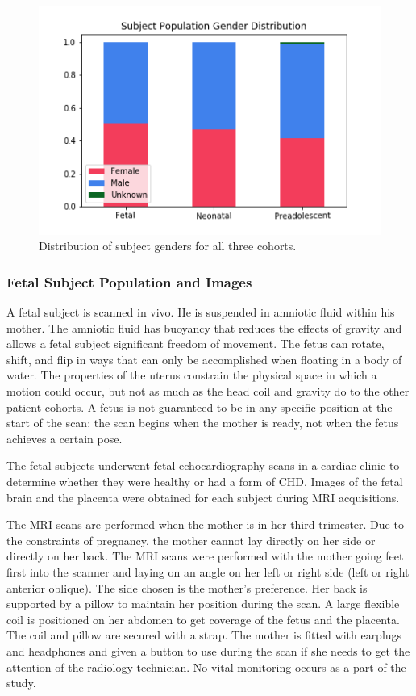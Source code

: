 \begin{figure}
\centering
\includegraphics[width=.75\textwidth]{5/demo_clinical_subj_gender.png}
\caption{Distribution of subject genders for all three cohorts.}
\label{ch5:clinical:gender}
\end{figure}

\subsubsection{Fetal Subject Population and Images}


A fetal subject is scanned in vivo. He is suspended in amniotic fluid within his mother. The amniotic fluid has buoyancy that reduces the effects of gravity and allows a fetal subject significant freedom of movement. The fetus can rotate, shift, and flip in ways that can only be accomplished when floating in a body of water. The properties of the uterus constrain the physical space in which a motion could occur, but not as much as the head coil and gravity do to the other patient cohorts. A fetus is not guaranteed to be in any specific position at the start of the scan: the scan begins when the mother is ready, not when the fetus achieves a certain pose. 

The fetal subjects underwent fetal echocardiography scans in a cardiac clinic to determine whether they were healthy or had a form of CHD. Images of the fetal brain and the placenta were obtained for each subject during MRI acquisitions.

The MRI scans are performed when the mother is in her third trimester. Due to the constraints of pregnancy, the mother cannot lay directly on her side or directly on her back. The MRI scans were performed with the mother going feet first into the scanner and laying on an angle on her left or right side (left or right anterior oblique). The side chosen is the mother's preference. Her back is supported by a pillow to maintain her position during the scan. A large flexible coil is positioned on her abdomen to get coverage of the fetus and the placenta. The coil and pillow are secured with a strap. The mother is fitted with earplugs and headphones and given a button to use during the scan if she needs to get the attention of the radiology technician. No vital monitoring occurs as a part of the study.

